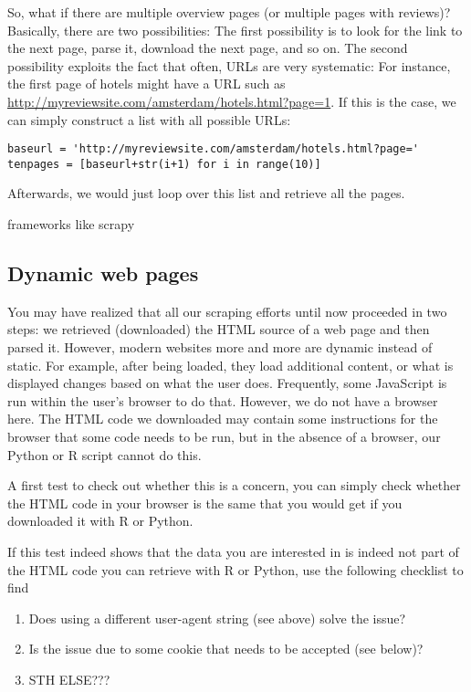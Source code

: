 So, what if there are multiple overview pages (or multiple pages with reviews)? Basically, there are two possibilities:
The first possibility is to look for the link to the next page, parse it, download the next page, and so on.
The second possibility exploits the fact that often, URLs are very systematic: For instance, the first page of hotels might have a URL such as \url{http://myreviewsite.com/amsterdam/hotels.html?page=1}.
If this is the case, we can simply construct a list with all possible URLs:
\begin{lstlisting}
baseurl = 'http://myreviewsite.com/amsterdam/hotels.html?page='
tenpages = [baseurl+str(i+1) for i in range(10)]
\end{lstlisting}
Afterwards, we would just loop over this list and retrieve all the pages.




frameworks like scrapy





\subsection{Dynamic web pages}
\label{sec:selenium}

You may have realized that all our scraping efforts until now proceeded in two steps: we retrieved (downloaded) the HTML source of a web page and then parsed it. However, modern websites more and more are dynamic instead of static. For example, after being loaded, they load additional content, or what is displayed changes based on what the user does. Frequently, some JavaScript is run within the user's browser to do that. However, we do not have a browser here. The HTML code we downloaded may contain some instructions for the browser that some code needs to be run, but in the absence of a browser, our Python or R script cannot do this.

A first test to check out whether this is a concern, you can simply check whether the HTML code in your browser is the same that you would get if you downloaded it with R or Python.



If this test indeed shows that the data you are interested in is indeed not part of the HTML code you can retrieve with R or Python, use the following checklist to find 

\begin{enumerate}
\item Does using a different user-agent string (see above) solve the issue?
\item Is the issue due to some cookie that needs to be accepted (see below)?
\item STH ELSE???
\end{enumerate}


